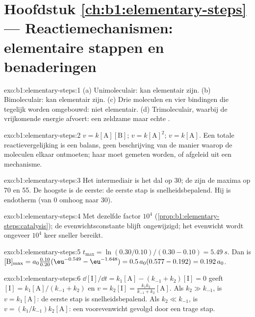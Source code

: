 \section*{Hoofdstuk \ref{ch:b1:elementary-steps} --- Reactiemechanismen: elementaire stappen en benaderingen}

\begin{solution}{exo:b1:elementary-steps:1}
(a) Unimoleculair: kan elementair zijn. (b) Bimoleculair: kan elementair
zijn. (c) Drie moleculen en vier bindingen die tegelijk worden
omgebouwd: niet elementair. (d) Trimoleculair, waarbij  de
vrijkomende energie afvoert: een zeldzame maar echte .
\end{solution}

\begin{solution}{exo:b1:elementary-steps:2}
$v = k[\mathrm{A}][\mathrm{B}]$; $v = k[\mathrm{A}]^2$; $v = k[\mathrm{A}]$.
Een totale reactievergelijking is een balans, geen beschrijving van de
manier waarop de moleculen elkaar ontmoeten; haar  moet
gemeten worden, of afgeleid uit een mechanisme.
\end{solution}

\begin{solution}{exo:b1:elementary-steps:3}
Het intermediair is het dal op 30; de  zijn de maxima
op 70 en 55. De hoogste  is de eerste: de eerste stap
is snelheidsbepalend. Hij is endotherm (van 0 omhoog naar 30).
\end{solution}

\begin{solution}{exo:b1:elementary-steps:4}
Met dezelfde factor $10^4$ (\cref{prop:b1:elementary-steps:catalysis}); de
evenwichtsconstante blijft ongewijzigd; het evenwicht wordt ongeveer
$10^4$ keer sneller bereikt.
\end{solution}

\begin{solution}{exo:b1:elementary-steps:5}
$t_{\max} = \ln(0.30/0.10)/(0.30 - 0.10) = \qty{5.49}{s}$. Dan is
$[\mathrm{B}]_{\max} = a_0\frac{0.10}{0.20}(\eu^{-0.549} - \eu^{-1.648}) =
0.5\,a_0(0.577 - 0.192) = 0.192\,a_0$.
\end{solution}

\begin{solution}{exo:b1:elementary-steps:6}
$\dd[\mathrm{I}]/\dd t = k_1[\mathrm{A}] - (k_{-1} + k_2)[\mathrm{I}] = 0$
geeft $[\mathrm{I}] = k_1[\mathrm{A}]/(k_{-1} + k_2)$ en $v = k_2[\mathrm{I}]
= \frac{k_1k_2}{k_{-1}+k_2}[\mathrm{A}]$. Als $k_2 \gg k_{-1}$, is $v =
k_1[\mathrm{A}]$: de eerste stap is snelheidsbepalend. Als $k_2 \ll k_{-1}$,
is $v = (k_1/k_{-1})k_2[\mathrm{A}]$: een voorevenwicht gevolgd door een
trage stap.
\end{solution}

